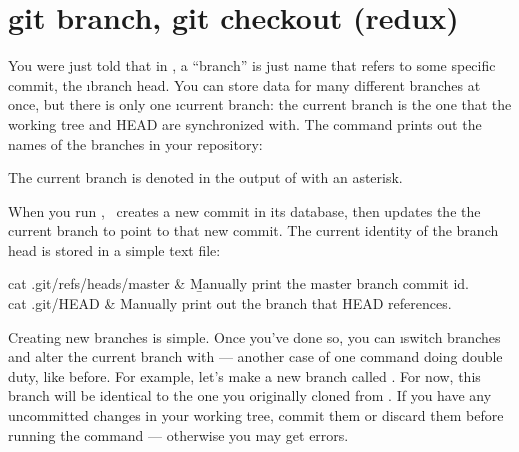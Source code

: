 \documentclass[letterpaper, 12pt, titlepage, twoside]{article}
\begin{document}
\section{git branch, git checkout (redux)}


You \x were just told that in \git, a ``branch'' is just name that refers to
some specific commit, the \i{branch head}. You can store data for many
different branches at once, but there is only one \i{current branch}: the
current branch is the one that the working tree and HEAD are synchronized
with. The  command prints out the names of the branches in your
repository:


The current branch is denoted in the output of  with an asterisk.



When \x you run , \git\ creates a new commit in its database, then
updates the the current branch to point to that new commit. The current
identity of the branch head is stored in a simple text file:

\begin{typeme}
cat .git/refs/heads/master & \b{Manually print the master branch commit id.} \\
cat .git/HEAD & Manually print out the branch that HEAD references.
\end{typeme}

Creating new branches is simple. Once you've done so, you can \i{switch
  branches} and alter the current branch with  --- another case
of one command doing double duty, like  before. For example, let's
make a new branch called . For now, this branch will be
identical to the one you originally cloned from \github. If you have any
uncommitted changes in your working tree, commit them or discard them before
running the  command --- otherwise you may get errors.
\end{document}
